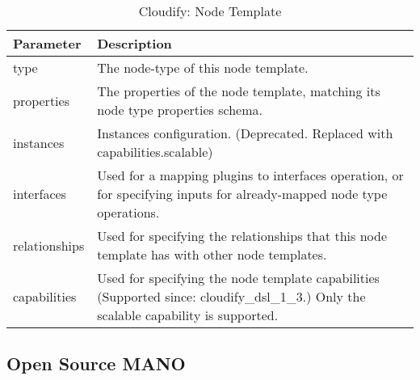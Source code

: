     \begin{table}[h]
        \centering
    \begin{tabular}{ |p{4cm}|p{10cm}|}
        \hline
        \textbf{Parameter} & \textbf{Description} \\
        \hline
         
         type &	The node-type of this node template. \\
         \hline
         properties &	The properties of the node template, matching its node type properties schema. \\
         \hline
         instances &	Instances configuration. (Deprecated. Replaced with capabilities.scalable) \\
         \hline
         interfaces	 & Used for a mapping plugins to interfaces operation, or for specifying inputs for already-mapped node type operations. \\
         \hline
         relationships &	Used for specifying the relationships that this node template has with other node templates. \\
         \hline
         capabilities &	Used for specifying the node template capabilities (Supported since: cloudify\_dsl\_1\_3.) Only the scalable capability is supported. \\
         \hline
    \end{tabular}
    \caption{Cloudify: Node Template}
    \label{tab:Cloudify_node_template}
 \end{table}

\subsection{Open Source MANO}
